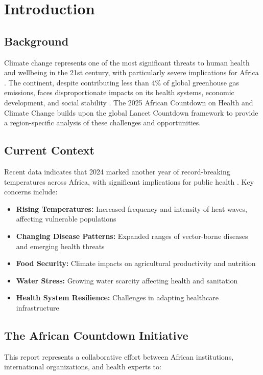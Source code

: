 \section{Introduction}
\label{sec:introduction}

\subsection{Background}
Climate change represents one of the most significant threats to human health and wellbeing in the 21st century, with particularly severe implications for Africa \citep{lancet2024}. The continent, despite contributing less than 4\% of global greenhouse gas emissions, faces disproportionate impacts on its health systems, economic development, and social stability \citep{africa2024}. The 2025 African Countdown on Health and Climate Change builds upon the global Lancet Countdown framework to provide a region-specific analysis of these challenges and opportunities.

\subsection{Current Context}
Recent data indicates that 2024 marked another year of record-breaking temperatures across Africa, with significant implications for public health \citep{who2024}. Key concerns include:

\begin{itemize}
    \item \textbf{Rising Temperatures:} Increased frequency and intensity of heat waves, affecting vulnerable populations
    \item \textbf{Changing Disease Patterns:} Expanded ranges of vector-borne diseases and emerging health threats
    \item \textbf{Food Security:} Climate impacts on agricultural productivity and nutrition
    \item \textbf{Water Stress:} Growing water scarcity affecting health and sanitation
    \item \textbf{Health System Resilience:} Challenges in adapting healthcare infrastructure
\end{itemize}

\subsection{The African Countdown Initiative}
This report represents a collaborative effort between African institutions, international organizations, and health experts to:

